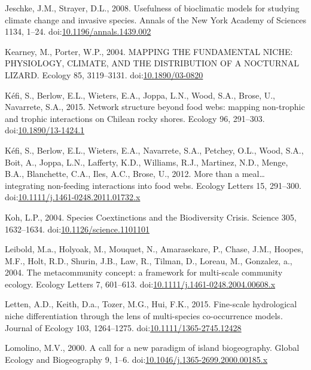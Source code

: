 \hypertarget{ref-Jeschke2008}{}
Jeschke, J.M., Strayer, D.L., 2008. Usefulness of bioclimatic models for
studying climate change and invasive species. Annals of the New York
Academy of Sciences 1134, 1--24.
doi:\href{https://doi.org/10.1196/annals.1439.002}{10.1196/annals.1439.002}

\hypertarget{ref-Kearney2004}{}
Kearney, M., Porter, W.P., 2004. MAPPING THE FUNDAMENTAL NICHE:
PHYSIOLOGY, CLIMATE, AND THE DISTRIBUTION OF A NOCTURNAL LIZARD. Ecology
85, 3119--3131.
doi:\href{https://doi.org/10.1890/03-0820}{10.1890/03-0820}

\hypertarget{ref-Kefi2015}{}
Kéfi, S., Berlow, E.L., Wieters, E.A., Joppa, L.N., Wood, S.A., Brose,
U., Navarrete, S.A., 2015. Network structure beyond food webs: mapping
non-trophic and trophic interactions on Chilean rocky shores. Ecology
96, 291--303.
doi:\href{https://doi.org/10.1890/13-1424.1}{10.1890/13-1424.1}

\hypertarget{ref-Kefi2012}{}
Kéfi, S., Berlow, E.L., Wieters, E.A., Navarrete, S.A., Petchey, O.L.,
Wood, S.A., Boit, A., Joppa, L.N., Lafferty, K.D., Williams, R.J.,
Martinez, N.D., Menge, B.A., Blanchette, C.A., Iles, A.C., Brose, U.,
2012. More than a meal\ldots{} integrating non-feeding interactions into
food webs. Ecology Letters 15, 291--300.
doi:\href{https://doi.org/10.1111/j.1461-0248.2011.01732.x}{10.1111/j.1461-0248.2011.01732.x}

\hypertarget{ref-Koh2004}{}
Koh, L.P., 2004. Species Coextinctions and the Biodiversity Crisis.
Science 305, 1632--1634.
doi:\href{https://doi.org/10.1126/science.1101101}{10.1126/science.1101101}

\hypertarget{ref-Leibold2004}{}
Leibold, M.a., Holyoak, M., Mouquet, N., Amarasekare, P., Chase, J.M.,
Hoopes, M.F., Holt, R.D., Shurin, J.B., Law, R., Tilman, D., Loreau, M.,
Gonzalez, a., 2004. The metacommunity concept: a framework for
multi-scale community ecology. Ecology Letters 7, 601--613.
doi:\href{https://doi.org/10.1111/j.1461-0248.2004.00608.x}{10.1111/j.1461-0248.2004.00608.x}

\hypertarget{ref-Letten2015}{}
Letten, A.D., Keith, D.a., Tozer, M.G., Hui, F.K., 2015. Fine-scale
hydrological niche differentiation through the lens of multi-species
co-occurrence models. Journal of Ecology 103, 1264--1275.
doi:\href{https://doi.org/10.1111/1365-2745.12428}{10.1111/1365-2745.12428}

\hypertarget{ref-Lomolino2000}{}
Lomolino, M.V., 2000. A call for a new paradigm of island biogeography.
Global Ecology and Biogeography 9, 1--6.
doi:\href{https://doi.org/10.1046/j.1365-2699.2000.00185.x}{10.1046/j.1365-2699.2000.00185.x}

